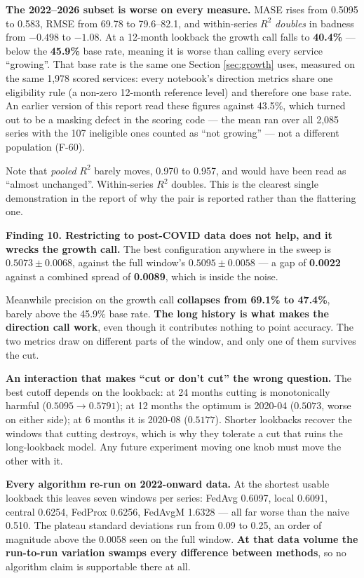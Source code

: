 \documentclass[11pt,a4paper]{article}
\newcommand{\keypoint}[1]{%
  \par\vspace{0.4em}%
  \noindent\colorbox{fed!8}{\parbox{0.98\textwidth}{\vspace{0.2em}#1\vspace{0.2em}}}%
  \par\vspace{0.4em}}
\begin{document}
\keypoint{\textbf{The 2022--2026 subset is worse on every measure.} MASE rises from 0.5095 to 0.583,
RMSE from 69.78 to 79.6--82.1, and within-series $R^2$ \emph{doubles} in badness from $-0.498$ to
$-1.08$. At a 12-month lookback the growth call falls to \textbf{40.4\%} --- below the \textbf{45.9\%}
base rate, meaning it is worse than calling every service ``growing''. That base rate is the same one
Section \ref{sec:growth} uses, measured on the same 1{,}978 scored services: every notebook's direction
metrics share one eligibility rule (a non-zero 12-month reference level) and therefore one base rate.
An earlier version of this report read these figures against 43.5\%, which turned out to be a masking
defect in the scoring code --- the mean ran over all 2{,}085 series with the 107 ineligible ones
counted as ``not growing'' --- not a different population (F-60).

Note that \emph{pooled} $R^2$ barely moves, 0.970 to 0.957, and would have been read as ``almost
unchanged''. Within-series $R^2$ doubles. This is the clearest single demonstration in the report of
why the pair is reported rather than the flattering one.}

\keypoint{\textbf{Finding 10. Restricting to post-COVID data does not help, and it wrecks the growth
call.} The best configuration anywhere in the sweep is $0.5073 \pm 0.0068$, against the full window's
$0.5095 \pm 0.0058$ --- a gap of \textbf{0.0022} against a combined spread of \textbf{0.0089}, which is
inside the noise.

Meanwhile precision on the growth call \textbf{collapses from 69.1\% to 47.4\%}, barely above the
45.9\% base rate. \textbf{The long history is what makes the direction call work}, even though it
contributes nothing to point accuracy. The two metrics draw on different parts of the window, and only
one of them survives the cut.}

\textbf{An interaction that makes ``cut or don't cut'' the wrong question.} The best cutoff depends on
the lookback: at 24 months cutting is monotonically harmful ($0.5095 \rightarrow 0.5791$); at 12 months
the optimum is 2020-04 ($0.5073$, worse on either side); at 6 months it is 2020-08 ($0.5177$). Shorter
lookbacks recover the windows that cutting destroys, which is why they tolerate a cut that ruins the
long-lookback model. Any future experiment moving one knob must move the other with it.

\textbf{Every algorithm re-run on 2022-onward data.} At the shortest usable lookback this leaves seven
windows per series: FedAvg 0.6097, local 0.6091, central 0.6254, FedProx 0.6256, FedAvgM 1.6328 ---
all far worse than the naive 0.510. The plateau standard deviations run from 0.09 to 0.25, an order of
magnitude above the 0.0058 seen on the full window. \textbf{At that data volume the run-to-run
variation swamps every difference between methods}, so no algorithm claim is supportable there at all.
\end{document}
